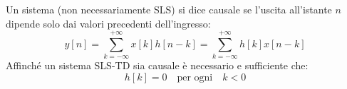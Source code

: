 Un sistema (non necessariamente SLS) si dice causale se l'uscita all'istante $n$ dipende solo dai valori precedenti dell'ingresso:
\begin{equation}
    y[n] = \sum_{k=-\infty}^{+\infty} x[k] h[n-k] = \sum_{k=-\infty}^{+\infty} h[k] x[n-k]
\end{equation}
Affinché un sistema SLS-TD sia causale è necessario e sufficiente che:
\begin{equation}
    h[k] = 0 \quad \text{per ogni} \quad k < 0
\end{equation}